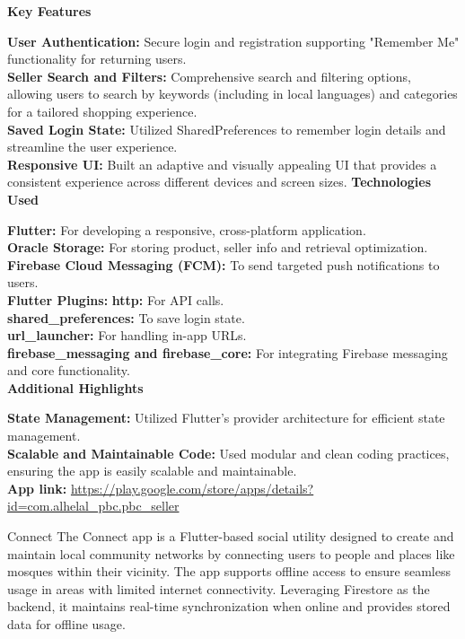 \documentclass[a4paper,12pt]{article}
\begin{document}
\begin{CV}
\textbf{Key Features}

\textbf{User Authentication:} Secure login and registration supporting "Remember Me" functionality for returning users.\\
\textbf{Seller Search and Filters:} Comprehensive search and filtering options, allowing users to search by keywords (including in local languages) and categories for a tailored shopping experience.\\
\textbf{Saved Login State:} Utilized SharedPreferences to remember login details and streamline the user experience.\\
\textbf{Responsive UI:} Built an adaptive and visually appealing UI that provides a consistent experience across different devices and screen sizes.
\textbf{Technologies Used}

\textbf{Flutter:} For developing a responsive, cross-platform application.\\
\textbf{Oracle Storage:} For storing product, seller info and retrieval optimization.\\
\textbf{Firebase Cloud Messaging (FCM):} To send targeted push notifications to users.\\
\textbf{Flutter Plugins:}
\textbf{http:} For API calls.\\
\textbf{shared\_preferences:} To save login state.\\
\textbf{url\_launcher:} For handling in-app URLs.\\
\textbf{firebase\_messaging and firebase\_core:} For integrating Firebase messaging and core functionality.\\
\textbf{Additional Highlights}

\textbf{State Management:} Utilized Flutter’s provider architecture for efficient state management.\\
\textbf{Scalable and Maintainable Code:} Used modular and clean coding practices, ensuring the app is easily scalable and maintainable.\\
\textbf{App link:} \href{https://play.google.com/store/apps/details?id=com.alhelal\_pbc.pbc\_seller}{https://play.google.com/store/apps/details?id=com.alhelal\_pbc.pbc\_seller}  
\item[Connect]
The Connect app is a Flutter-based social utility designed to create and maintain local community networks by connecting users to people and places like mosques within their vicinity. The app supports offline access to ensure seamless usage in areas with limited internet connectivity. Leveraging Firestore as the backend, it maintains real-time synchronization when online and provides stored data for offline usage.


\end{CV}
\end{document}
